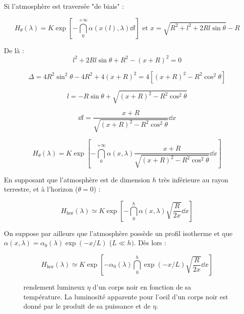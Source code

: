\documentclass[11pt]{article} %
\begin{document}
Si l'atmosphère est traversée "de biais" : 

\begin{equation}
H_\theta(\lambda) = K \exp \left [ -\dint_0^{+\infty} \alpha(x(l), \lambda) \dd l\right ] \mbox{ et } x = \sqrt{R^2 + l^2 + 2 R l \sin \theta} - R
\end{equation}

De là : 
\begin{equation}
l^2 + 2 R l \sin \theta + R^2 - (x+R)^2 = 0
\end{equation}

\begin{equation}
\Delta = 4 R^2 \sin^2 \theta - 4 R^2 + 4 (x+R)^2 = 4 \left [ (x+R)^2 -  R^2\cos^2 \theta \right ]
\end{equation}

\begin{equation}
l = - R \sin \theta + \sqrt{(x+R)^2 -  R^2\cos^2 \theta }
\end{equation}

\begin{equation}
\dd l =  \dfrac{x + R}{\sqrt{(x+R)^2 -  R^2\cos^2 \theta }} \dd x
\end{equation}

\begin{equation}
H_\theta(\lambda) = K \exp \left [ -\dint_0^{+\infty} \alpha(x, \lambda) \dfrac{x + R}{\sqrt{(x+R)^2 -  R^2\cos^2 \theta }} \dd x\right ] 
\end{equation}

En supposant que l'atmosphère est de dimension $h$ très inférieure au rayon terrestre, et à l'horizon ($\theta = 0$) :

\begin{equation}
H_{\mbox{hor}}(\lambda) \simeq K \exp \left [ -\dint_0^{h} \alpha(x, \lambda) \sqrt{\dfrac{R}{2x}} \dd x\right ] 
\end{equation}

On suppose par ailleurs que l'atmosphère possède un profil isotherme et que $\alpha(x, \lambda) = \alpha_0(\lambda) \exp(-x/L)$ ($L \ll h)$. Dès lors :

\begin{equation}
H_{\mbox{hor}}(\lambda) \simeq K \exp \left [ - \alpha_0 (\lambda) \dint_0^{h} \exp(-x/L) \sqrt{\dfrac{R}{2x}} \dd x\right ] 
\end{equation}

\begin{figure}[H]
\centering
  \caption{rendement lumineux $\eta$ d'un corps noir en fonction de sa température. La luminosité apparente pour l'oeil d'un corps noir est donné par le produit de sa puissance et de $\eta$. 
\label{fig:eta}}

\end{figure}
\end{document}
